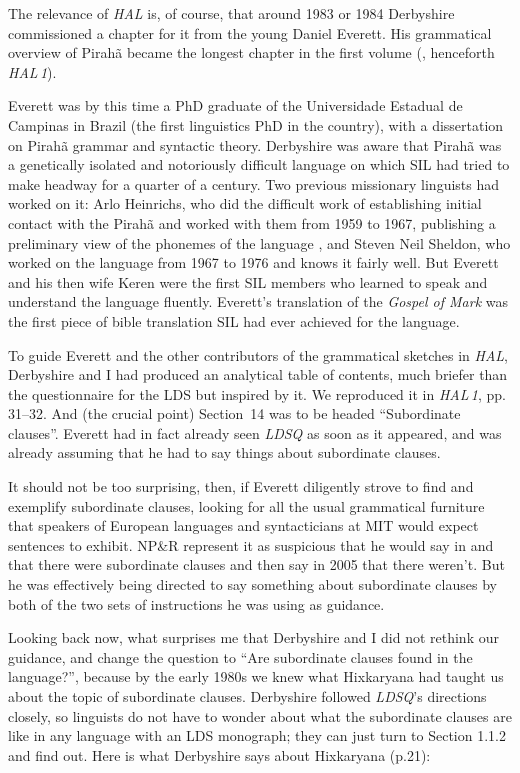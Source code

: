 \documentclass[output=paper,colorlinks,citecolor=brown
]{langscibook}
\begin{document}
The relevance of \textit{HAL} is, of course, that around 1983 or 1984
Derbyshire commissioned a chapter for it from the young Daniel Everett.
His grammatical overview of Pirah{\~a} became the longest chapter in
the first volume (\citealt{DerbPull86}, henceforth \textit{HAL\,1}).

Everett was by this time a PhD graduate of the Universidade Estadual
de Campinas in Brazil (the first linguistics PhD in the country),
with a dissertation on Pirah{\~a} grammar and syntactic theory.
Derbyshire was aware that Pirah{\~a} was a genetically isolated and
notoriously difficult language on which SIL had tried to make headway
for a quarter of a century. Two previous missionary linguists had
worked on it: Arlo Heinrichs, who did the difficult work of
establishing initial contact with the Pirah{\~a} and worked with them
from 1959 to 1967, publishing a preliminary view of the phonemes of
the language \citep{Heinrichs64}, and Steven Neil Sheldon, who worked
on the language from 1967 to 1976 and knows it fairly well. But Everett
and his then wife Keren were the first SIL members who learned to
speak and understand the language fluently. Everett's translation of
the \textit{Gospel of Mark} \citep{Everett86Mark} was the first piece
of bible translation SIL had ever achieved for the language.

To guide Everett and the other contributors of the grammatical sketches
in \textit{HAL}, Derbyshire and I had produced an analytical table
of contents, much briefer than the questionnaire for the LDS but
inspired by it. We reproduced it in \textit{HAL\,1}, pp.\,31--32.
And (the crucial point) Section~14 was to be headed ``Subordinate
clau\-ses''. Everett had in fact already seen \textit{LDSQ} as soon as
it appeared, and was already assuming that he had to say things about
subordinate clauses.



It should not be too surprising, then, if Everett diligently strove
to find and exemplify subordinate clauses, looking for all the usual
grammatical furniture that speakers of European languages and
syntacticians at MIT would expect sentences to exhibit. NP\&R represent
it as suspicious that he would say in \citeyear{Everett83} and
\citeyear{Everett86HAL} that there were subordinate clauses and then
say in 2005 that there weren't. But he was effectively being directed
to say something about subordinate clauses by both of the two sets of
instructions he was using as guidance.

Looking back now, what surprises me that Derbyshire and I did not rethink
our guidance, and change the question to ``Are subordinate clauses found
in the language?'', because by the early 1980s we knew what Hixkaryana had
taught us about the topic of subordinate clauses. Derbyshire followed
\textit{LDSQ}'s directions closely, so linguists do not have to wonder
about what the subordinate clauses are like in any language with an
LDS monograph; they can just turn to Section 1.1.2 and find out. Here
is what Derbyshire says about Hixkaryana (p.21):
\end{document}
